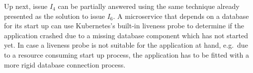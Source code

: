 Up next, issue $I_4$ can be partially answered using the same technique already
presented as the solution to issue $I_6$. A microservice that depends on a
database for its start up can use Kubernetes's built-in liveness probe to
determine if the application crashed due to a missing database component which
has not started yet. In case a liveness probe is not suitable for the
application at hand, e.g.\ due to a resource consuming start up process, the
application has to be fitted with a more rigid database connection process.

\begin{figure}[H]
  \hspace*{\fill}%
  \qquad
\end{figure}
